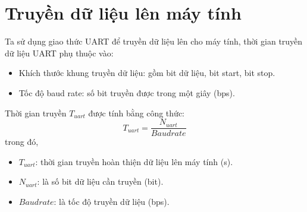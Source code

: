 \section{Truyền dữ liệu lên máy tính}
Ta sử dụng giao thức UART để truyền dữ liệu lên cho máy tính, thời gian truyền dữ liệu UART phụ thuộc vào:
\begin{itemize}[label = -]
	\item Khích thước khung truyền dữ liệu: gồm bit dữ liệu, bit start, bit stop.
	\item Tốc độ baud rate: số bit truyền được trong một giây (bps).
\end{itemize}

Thời gian truyền $T_{uart}$ được tính bằng công thức: \[ T_{uart} = \dfrac{N_{uart}}{Baud rate} \]
trong đó,
\begin{itemize}[label = -]
	\item $ T_{uart}$: thời gian truyền hoàn thiện dữ liệu lên máy tính (s).
	\item $N_{uart}$: là số bit dữ liệu cần truyền (bit).
	\item $Baud rate$: là tốc độ truyền dữ liệu (bps).
\end{itemize}

